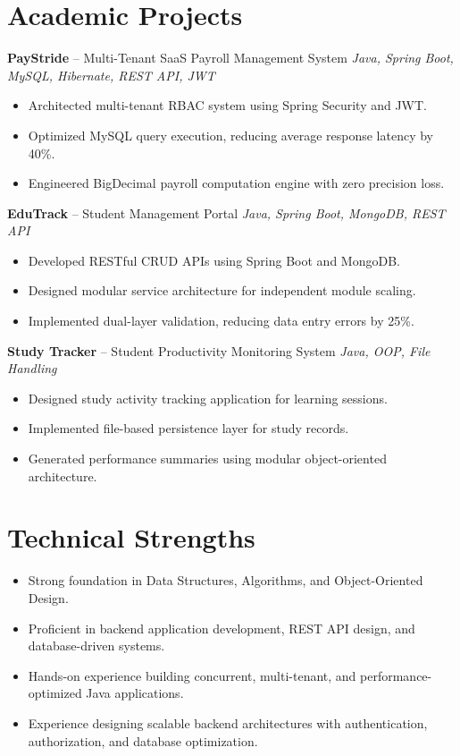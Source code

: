 \documentclass[10.5pt,a4paper]{article}
\begin{document}
\section{Academic Projects}
\textbf{PayStride} -- Multi-Tenant SaaS Payroll Management System \hfill \textit{Java, Spring Boot, MySQL, Hibernate, REST API, JWT}
\begin{itemize}
  \item Architected multi-tenant RBAC system using Spring Security and JWT.
  \item Optimized MySQL query execution, reducing average response latency by 40\%.
  \item Engineered BigDecimal payroll computation engine with zero precision loss.
\end{itemize}
\vspace{4pt}
\textbf{EduTrack} -- Student Management Portal \hfill \textit{Java, Spring Boot, MongoDB, REST API}
\begin{itemize}
  \item Developed RESTful CRUD APIs using Spring Boot and MongoDB.
  \item Designed modular service architecture for independent module scaling.
  \item Implemented dual-layer validation, reducing data entry errors by 25\%.
\end{itemize}
\vspace{4pt}
\textbf{Study Tracker} -- Student Productivity Monitoring System \hfill \textit{Java, OOP, File Handling}
\begin{itemize}
  \item Designed study activity tracking application for learning sessions.
  \item Implemented file-based persistence layer for study records.
  \item Generated performance summaries using modular object-oriented architecture.
\end{itemize}
\section{Technical Strengths}
\begin{itemize}
  \item Strong foundation in Data Structures, Algorithms, and Object-Oriented Design.
  \item Proficient in backend application development, REST API design, and database-driven systems.
  \item Hands-on experience building concurrent, multi-tenant, and performance-optimized Java applications.
  \item Experience designing scalable backend architectures with authentication, authorization, and database optimization.
\end{itemize}
\end{document}

